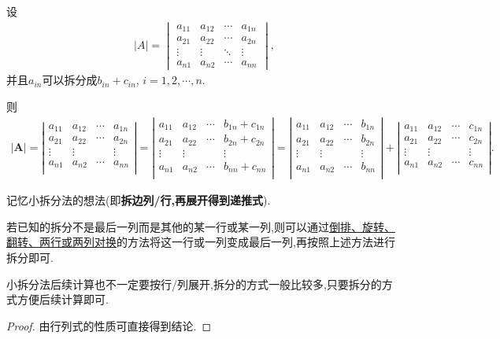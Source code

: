 \documentclass[../../main.tex]{subfiles}
\begin{document}
\begin{proposition}\label{小拆分法}
设
\begin{align*}
|A| = 
\begin{vmatrix}
a_{11} & a_{12} & \cdots & a_{1n} \\
a_{21} & a_{22} & \cdots & a_{2n} \\
\vdots & \vdots & \ddots & \vdots \\
a_{n1} & a_{n2} & \cdots & a_{nn}
\end{vmatrix},
\nonumber
\end{align*}
并且$a_{in}$可以拆分成$b_{in}+c_{in}$,$\,\,i=1,2,\cdots,n.$

则
\begin{align*}
\left| \boldsymbol{A} \right|=\left| \begin{matrix}
a_{11}&		a_{12}&		\cdots&		a_{1n}\\
a_{21}&		a_{22}&		\cdots&		a_{2n}\\
\vdots&		\vdots&		&		\vdots\\
a_{n1}&		a_{n2}&		\cdots&		a_{nn}\\
\end{matrix} \right|=\left| \begin{matrix}
a_{11}&		a_{12}&		\cdots&		b_{1n}+c_{1n}\\
a_{21}&		a_{22}&		\cdots&		b_{2n}+c_{2n}\\
\vdots&		\vdots&		&		\vdots\\
a_{n1}&		a_{n2}&		\cdots&		b_{nn}+c_{nn}\\
\end{matrix} \right|=\left| \begin{matrix}
a_{11}&		a_{12}&		\cdots&		b_{1n}\\
a_{21}&		a_{22}&		\cdots&		b_{2n}\\
\vdots&		\vdots&		&		\vdots\\
a_{n1}&		a_{n2}&		\cdots&		b_{nn}\\
\end{matrix} \right|+\left| \begin{matrix}
a_{11}&		a_{12}&		\cdots&		c_{1n}\\
a_{21}&		a_{22}&		\cdots&		c_{2n}\\
\vdots&		\vdots&		&		\vdots\\
a_{n1}&		a_{n2}&		\cdots&		c_{nn}\\
\end{matrix} \right|.
\end{align*}
\end{proposition}
\begin{note}
记忆小拆分法的想法(即\textbf{拆边列/行,再展开得到递推式}).
\end{note}
\begin{remark}
若已知的拆分不是最后一列而是其他的某一行或某一列,则可以通过\hyperref[pro:行列式计算常识]{倒排、旋转、翻转、两行或两列对换}的方法将这一行或一列变成最后一列,再按照上述方法进行拆分即可.

小拆分法后续计算也不一定要按行/列展开,拆分的方式一般比较多,只要拆分的方式方便后续计算即可. 
\end{remark}
\begin{proof}
由行列式的性质可直接得到结论.
\end{proof}
\end{document}
